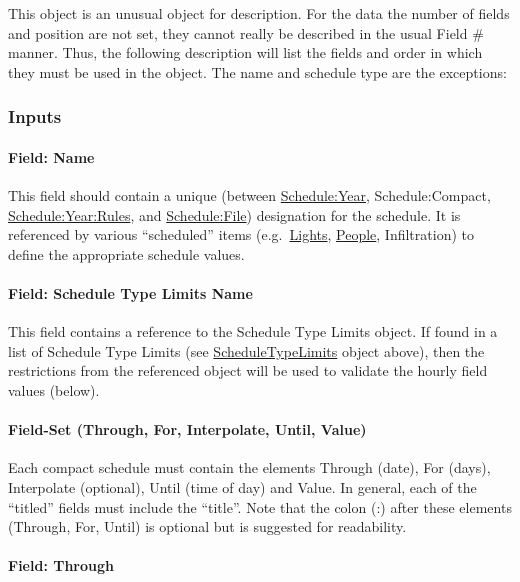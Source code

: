 This object is an unusual object for description. For the data the number of fields and position are not set, they cannot really be described in the usual Field \# manner. Thus, the following description will list the fields and order in which they must be used in the object. The name and schedule type are the exceptions:

\subsubsection{Inputs}\label{inputs-7-023}

\paragraph{Field: Name}\label{field-name-6-019}

This field should contain a unique (between \hyperref[scheduleyear]{Schedule:Year}, Schedule:Compact, \hyperref[scheduleyearrules]{Schedule:Year:Rules}, and \hyperref[schedulefile]{Schedule:File}) designation for the schedule. It is referenced by various ``scheduled'' items (e.g.~\hyperref[lights-000]{Lights}, \hyperref[people]{People}, Infiltration) to define the appropriate schedule values.

\paragraph{Field: Schedule Type Limits Name}\label{field-schedule-type-limits-name-4}

This field contains a reference to the Schedule Type Limits object. If found in a list of Schedule Type Limits (see \hyperref[scheduletypelimits]{ScheduleTypeLimits} object above), then the restrictions from the referenced object will be used to validate the hourly field values (below).

\paragraph{Field-Set (Through, For, Interpolate, Until, Value)}\label{field-set-through-for-interpolate-until-value}

Each compact schedule must contain the elements Through (date), For (days), Interpolate (optional), Until (time of day) and Value. In general, each of the ``titled'' fields must include the ``title''. Note that the colon (:) after these elements (Through, For, Until) is optional but is suggested for readability.

\paragraph{Field: Through}\label{field-through}

